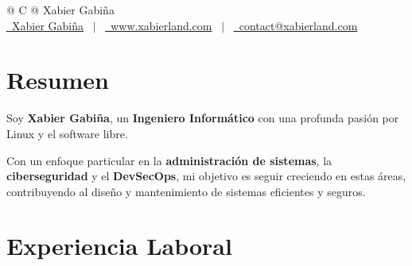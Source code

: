 \documentclass[a4paper,12pt]{article}
\begin{document}
\pagestyle{empty} 



\begin{tabularx}{\linewidth}{@{} C @{}}
\Huge{Xabier Gabiña} \\[7.5pt]
\href{https://linkedin.com/in/xabier-gabina}{\raisebox{-0.05\height}\faLinkedin\ Xabier Gabiña} \ $|$ \ 
\href{https://www.xabierland.com/}{\raisebox{-0.05\height}\faGlobe \ www.xabierland.com} \ $|$ \ 
\href{mailto:contact@xabierland.com}{\raisebox{-0.05\height}\faEnvelope \ contact@xabierland.com} \ %
\end{tabularx}


\section{Resumen}
Soy \textbf{Xabier Gabiña}, un \textbf{Ingeniero Informático} con una profunda pasión por Linux y el software libre.

Con un enfoque particular en la \textbf{administración de sistemas}, la \textbf{ciberseguridad} y el \textbf{DevSecOps}, mi objetivo es seguir creciendo en estas áreas, contribuyendo al diseño y mantenimiento de sistemas eficientes y seguros.

\section{Experiencia Laboral}
\end{document}
